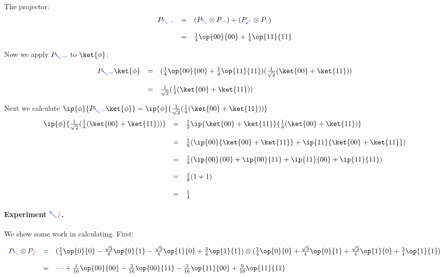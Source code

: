 \documentclass{article}
\newcommand{\xplus}{{\color{cyan}\rightarrow}}
\newcommand{\xminus}{{\color{cyan}\uparrow}}
\newcommand{\yplus}{{\color{blue}\nwarrow}}
\newcommand{\yminus}{{\color{blue}\swarrow}}
\newcommand{\zplus}{{\color{red}\sswarrow}}
\theoremstyle{remark}
\def\srtt{\frac{1}{\sqrt{2}}}
\begin{document}
The projector:
\[
    \begin{array}{rcl}
        P_{\yplus\xplus} 
        &=& (P_{\yplus}\otimes P_{\xplus}) + (P_{\yminus} \otimes P_{\xminus}) 
        \\ \\
        &=&  \frac{1}{4} \op{00}{00} + \frac{1}{4} \op{11}{11} 
    \end{array}
\]

Now we apply $P_{\yplus\xplus}$ to $\ket{\phi}$:

\[
    \begin{array}{rcl}
        P_{\yplus\xplus}\ket{\phi} 
        &=&  (\frac{1}{4} \op{00}{00} + \frac{1}{4} \op{11}{11})
        (\srtt(\ket{00} + \ket{11}))
        \\ \\
        &=& \srtt(\frac{1}{4}(\ket{00} + \ket{11}))
    \end{array}
\]

Next we calculate 
$\ip{\phi}{P_{\yplus\xplus}\ket{\phi}} = \ip{\phi}{\srtt(\frac{1}{4}(\ket{00} + \ket{11}))}$
\[
    \begin{array}{rcl}
        \ip{\phi}{\srtt(\frac{1}{4}(\ket{00} + \ket{11}))}
        &=& \frac{1}{2}\ip{\ket{00} + \ket{11}}{\frac{1}{4}(\ket{00} + \ket{11})}
        \\ \\ 
        &=& \frac{1}{8}(\ip{00}{\ket{00} + \ket{11}} + \ip{11}{\ket{00} + \ket{11}})
        \\ \\
        &=& \frac{1}{8}(\ip{00}{00} + \ip{00}{11} + \ip{11}{00} + \ip{11}{11})
        \\ \\
        &=& \frac{1}{8}(1 + 1) 
        \\ \\
        &=& \frac{1}{4}
    \end{array}
\]



\paragraph*{Experiment $\yplus\zplus$.} 
We show some work in calculating. First:

\[
    \begin{array}{rcl}
    P_{\yplus}\otimes P_{\zplus}
        &=& (\frac{1}{4} \op{0}{0} 
                - \frac{\sqrt{3}}{4} \op{0}{1} 
                - \frac{\sqrt{3}}{4} \op{1}{0} 
                + \frac{3}{4} \op{1}{1})
             \otimes 
            (\frac{1}{4} \op{0}{0} 
                + \frac{\sqrt{3}}{4} \op{0}{1} 
                + \frac{\sqrt{3}}{4} \op{1}{0} 
                + \frac{3}{4} \op{1}{1})
        \\ \\
        &=& \dots 
        + \frac{1}{16}\op{00}{00}
        - \frac{3}{16}\op{00}{11}
        - \frac{3}{16}\op{11}{00}
        + \frac{9}{16}\op{11}{11}
    \end{array}
\]
\end{document}
